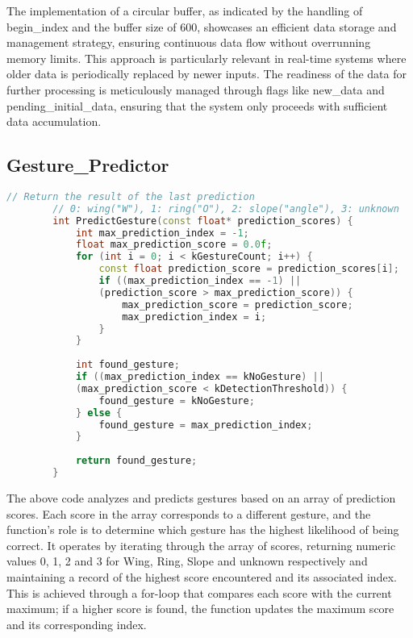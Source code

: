 	The implementation of a circular buffer, as indicated by the handling of begin\_index and the buffer size of 600, showcases an efficient data storage and management strategy, ensuring continuous data flow without overrunning memory limits. This approach is particularly relevant in real-time systems where older data is periodically replaced by newer inputs. The readiness of the data for further processing is meticulously managed through flags like new\_data and pending\_initial\_data, ensuring that the system only proceeds with sufficient data accumulation. 
	
	\subsection{Gesture\_Predictor}
	\begin{lstlisting}[language=C++, caption={Gesture Prediction Based on Model Output Scores}, label={code:gesture-prediction}, style=bashstyle]
		// Return the result of the last prediction
		// 0: wing("W"), 1: ring("O"), 2: slope("angle"), 3: unknown
		int PredictGesture(const float* prediction_scores) {
			int max_prediction_index = -1;
			float max_prediction_score = 0.0f;
			for (int i = 0; i < kGestureCount; i++) {
				const float prediction_score = prediction_scores[i];
				if ((max_prediction_index == -1) ||
				(prediction_score > max_prediction_score)) {
					max_prediction_score = prediction_score;
					max_prediction_index = i;
				}
			}
			
			int found_gesture;
			if ((max_prediction_index == kNoGesture) ||
			(max_prediction_score < kDetectionThreshold)) {
				found_gesture = kNoGesture;
			} else {
				found_gesture = max_prediction_index;
			}
			
			return found_gesture;
		}
	\end{lstlisting}
	
	
	The above code analyzes and predicts gestures based on an array of prediction scores. Each score in the array corresponds to a different gesture, and the function's role is to determine which gesture has the highest likelihood of being correct. It operates by iterating through the array of scores, returning numeric values 0, 1, 2 and
	3 for Wing, Ring, Slope and unknown respectively and maintaining a record of the highest score encountered and its associated index. This is achieved through a for-loop that compares each score with the current maximum; if a higher score is found, the function updates the maximum score and its corresponding index. 
	
